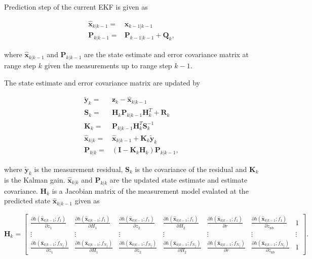 \documentclass[technicalnote,oneauthor,latex,dvi2pdf,10pt,a4paper]{Definitions/mdpi}
\begin{document}
Prediction step of the current EKF is given as

\begin{align}
\label{eq:prediction}
\hat{\mathbf{x}}_{k|k-1} = & \hat{\mathbf{x}}_{k-1|k-1} \\ \nonumber
\boldsymbol{P}_{k|k-1} = & \boldsymbol{P}_{k-1|k-1} + \boldsymbol{Q}_k,
\end{align}

\noindent where $\hat{\mathbf{x}}_{k|k-1}$ and $\boldsymbol{P}_{k|k-1}$ are the state estimate and error covariance matrix at range step $k$ given the measurements up to range step $k-1$.

The state estimate and error covariance matrix are updated by

\begin{align}
\label{eq:update}
\tilde{\mathbf{y}}_{k} = & \mathbf{z}_k - \hat{\mathbf{x}}_{k|k-1} \\ \nonumber
\boldsymbol{S}_k = & \boldsymbol{H}_k \boldsymbol{P}_{k|k-1} \boldsymbol{H}_k^T
+ \boldsymbol{R}_k \\ \nonumber
\boldsymbol{K}_k = & \boldsymbol{P}_{k|k-1} \boldsymbol{H}_k^T \boldsymbol{S}_k^{-1} \\ \nonumber
\hat{\mathbf{x}}_{k|k} = & \hat{\mathbf{x}}_{k|k-1} + \boldsymbol{K}_k \tilde{\mathbf{y}}_{k} \\ \nonumber
\boldsymbol{P}_{k|k} = & \left(\boldsymbol{I} - \boldsymbol{K}_k \boldsymbol{H}_k \right)\boldsymbol{P}_{k|k-1},
\end{align}

\noindent where $\tilde{\mathbf{y}}_{k}$ is the measurement residual, $\boldsymbol{S}_k$ is the covariance of the residual and $\boldsymbol{K}_k$ is the Kalman gain.
$\hat{\mathbf{x}}_{k|k}$ and $\boldsymbol{P}_{k|k}$ are the updated state estimate and estimate covariance.
$\boldsymbol{H}_k$ is a Jacobian matrix of the measurement model evalated at the predicted state $\hat{\mathbf{x}}_{k|k-1}$ given as

\begin{equation}
\label{eq:jacobian}
\boldsymbol{H}_k = 
\begin{bmatrix}
\frac{\partial h(\hat{\mathbf{x}}_{k|k-1};f_1)}{\partial z_1}
& \frac{\partial h(\hat{\mathbf{x}}_{k|k-1};f_1)}{\partial H_1}
& \frac{\partial h(\hat{\mathbf{x}}_{k|k-1};f_1)}{\partial z_2}
& \frac{\partial h(\hat{\mathbf{x}}_{k|k-1};f_1)}{\partial H_2}
& \frac{\partial h(\hat{\mathbf{x}}_{k|k-1};f_1)}{\partial r}
& \frac{\partial h(\hat{\mathbf{x}}_{k|k-1};f_1)}{\partial z_\text{nb}}
& 1 \\
\vdots & \vdots & \vdots & \vdots & \vdots & \vdots & \vdots \\
\frac{\partial h(\hat{\mathbf{x}}_{k|k-1};f_{N_f})}{\partial z_1}
& \frac{\partial h(\hat{\mathbf{x}}_{k|k-1};f_{N_f})}{\partial H_1}
& \frac{\partial h(\hat{\mathbf{x}}_{k|k-1};f_{N_f})}{\partial z_2}
& \frac{\partial h(\hat{\mathbf{x}}_{k|k-1};f_{N_f})}{\partial H_2}
& \frac{\partial h(\hat{\mathbf{x}}_{k|k-1};f_{N_f})}{\partial r}
& \frac{\partial h(\hat{\mathbf{x}}_{k|k-1};f_{N_f})}{\partial z_\text{nb}}
& 1
\end{bmatrix}.
\end{equation}
\end{document}

